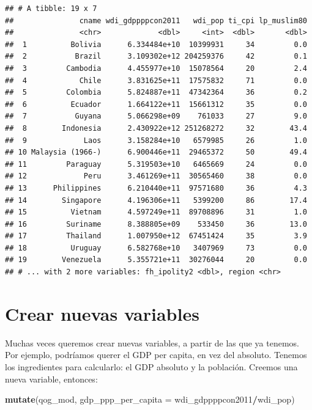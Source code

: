 \documentclass[]{book}
\newenvironment{Shaded}{\begin{snugshade}}{\end{snugshade}}
\newcommand{\KeywordTok}[1]{\textcolor[rgb]{0.13,0.29,0.53}{\textbf{#1}}}
\newcommand{\DataTypeTok}[1]{\textcolor[rgb]{0.13,0.29,0.53}{#1}}
\newcommand{\OperatorTok}[1]{\textcolor[rgb]{0.81,0.36,0.00}{\textbf{#1}}}
\newcommand{\NormalTok}[1]{#1}
\begin{document}
\begin{verbatim}
## # A tibble: 19 x 7
##               cname wdi_gdppppcon2011   wdi_pop ti_cpi lp_muslim80
##               <chr>             <dbl>     <int>  <dbl>       <dbl>
##  1          Bolivia      6.334484e+10  10399931     34         0.0
##  2           Brazil      3.109302e+12 204259376     42         0.1
##  3         Cambodia      4.455977e+10  15078564     20         2.4
##  4            Chile      3.831625e+11  17575832     71         0.0
##  5         Colombia      5.824887e+11  47342364     36         0.2
##  6          Ecuador      1.664122e+11  15661312     35         0.0
##  7           Guyana      5.066298e+09    761033     27         9.0
##  8        Indonesia      2.430922e+12 251268272     32        43.4
##  9             Laos      3.158284e+10   6579985     26         1.0
## 10 Malaysia (1966-)      6.900446e+11  29465372     50        49.4
## 11         Paraguay      5.319503e+10   6465669     24         0.0
## 12             Peru      3.461269e+11  30565460     38         0.0
## 13      Philippines      6.210440e+11  97571680     36         4.3
## 14        Singapore      4.196306e+11   5399200     86        17.4
## 15          Vietnam      4.597249e+11  89708896     31         1.0
## 16         Suriname      8.388805e+09    533450     36        13.0
## 17         Thailand      1.007950e+12  67451424     35         3.9
## 18          Uruguay      6.582768e+10   3407969     73         0.0
## 19        Venezuela      5.355721e+11  30276044     20         0.0
## # ... with 2 more variables: fh_ipolity2 <dbl>, region <chr>
\end{verbatim}

\section{Crear nuevas variables}\label{crear-nuevas-variables}

Muchas veces queremos crear nuevas variables, a partir de las que ya
tenemos. Por ejemplo, podríamos querer el GDP per capita, en vez del
absoluto. Tenemos los ingredientes para calcularlo: el GDP absoluto y la
población. Creemos una nueva variable, entonces:

\begin{Shaded}
\begin{Highlighting}[]
\KeywordTok{mutate}\NormalTok{(qog_mod, }\DataTypeTok{gdp_ppp_per_capita =}\NormalTok{ wdi_gdppppcon2011}\OperatorTok{/}\NormalTok{wdi_pop)}
\end{Highlighting}
\end{Shaded}
\end{document}
